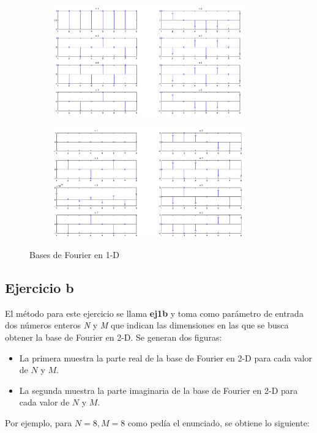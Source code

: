 \documentclass{article}
\begin{document}
\begin{figure}[H]
    \begin{subfigure}{0.5\textwidth}
        \includegraphics[width=0.9\textwidth]{parteReal8.png}
    \end{subfigure}\hfill
    \begin{subfigure}{0.5\textwidth}
        \includegraphics[width=0.9\textwidth]{parteImagN8.png}
    \end{subfigure}
    \caption{Bases de Fourier en 1-D}
\end{figure}

\subsection*{Ejercicio b}

El método para este ejercicio se llama \textbf{ej1b} y toma como parámetro de entrada dos números enteros \textit{N} y \textit{M} que indican las dimensiones en las que se busca obtener la base de Fourier en 2-D. Se generan dos figuras:
\begin{itemize}
\item La primera muestra la parte real de la base de Fourier en 2-D para cada valor de $N$ y $M$.
\item La segunda muestra la parte imaginaria de la base de Fourier en 2-D para cada valor de $N$ y $M$.
\end{itemize} Por ejemplo, para $N=8, M=8$ como pedía el enunciado, se obtiene lo siguiente:
\end{document}
